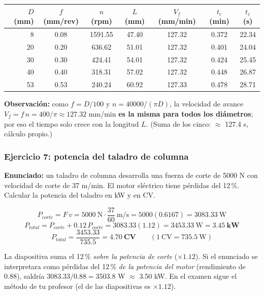 \documentclass[12pt,a4paper]{article}
\begin{document}
\begin{center}
	\small
	\begin{tabular}{@{}rcccccc@{}}
		\toprule
		$D$ (mm) & $f$ (mm/rev) & $n$ (rpm) & $L$ (mm) & $V_f$ (mm/min) & $t_c$ (min) & $t_c$ (s) \\
		\midrule
		8        & 0.08         & 1591.55   & 47.40    & 127.32         & 0.372
		         & 22.34
		\\
		20       & 0.20         & 636.62    & 51.01    & 127.32         & 0.401
		         & 24.04
		\\
		30       & 0.30         & 424.41    & 54.01    & 127.32         & 0.424
		         & 25.45                                                                          \\
		40       & 0.40         & 318.31    & 57.02    & 127.32         & 0.448
		         & 26.87
		\\
		53       & 0.53         & 240.24    & 60.92    & 127.33         & 0.478
		         & 28.71
		\\
		\bottomrule
	\end{tabular}
\end{center}
\textbf{Observación:} como $f = D/100$ y $n = 40000/(\pi D)$, la velocidad de avance $V_f = f\,n = 400/\pi \approx 127.32$ mm/min \textbf{es la misma para todos los diámetros}; por eso el tiempo solo crece con la longitud $L$. (Suma de los cinco: $\approx$ 127.4 s, cálculo propio.)

\subsubsection*{Ejercicio 7: potencia del taladro de columna}
\textbf{Enunciado:} un taladro de columna desarrolla una fuerza de corte de 5000
N con velocidad de corte de 37 m/min. El motor eléctrico tiene pérdidas del
12\,\%. Calcular la potencia del taladro en kW y en CV.

\[ P_{corte} = F\,v = 5000\ \text{N}\cdot\frac{37}{60}\ \text{m/s} =
	5000(0.6167) = 3083.33\ \text{W} \]
\[ P_{total} = P_{corte} + 0.12\,P_{corte} = 3083.33(1.12) = 3453.33\ \text{W} =
	\mathbf{3.45\ kW} \]
\[ P_{total} = \frac{3453.33}{735.5} = \mathbf{4.70\ CV} \qquad (1\ \text{CV} =
	735.5\ \text{W}) \]

\begin{aviso}
	La diapositiva suma el 12\,\% \emph{sobre la potencia de corte} ($\times
		1.12$). Si el enunciado se interpretara como pérdidas del 12\,\% \emph{de la
		potencia del motor} (rendimiento de 0.88), saldría $3083.33/0.88 = 3503.8$ W
	$\approx$ 3.50 kW. En el examen sigue el método de tu profesor (el de las
	diapositivas es $\times1.12$).
\end{aviso}
\end{document}
